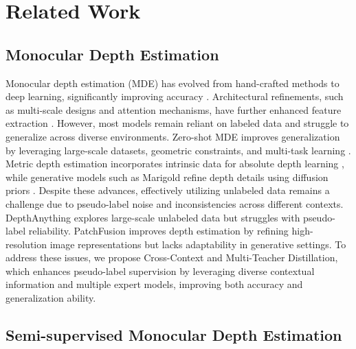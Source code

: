 \section{Related Work}
\label{sec:Related}
\subsection{Monocular Depth Estimation}
Monocular depth estimation (MDE) has evolved from hand-crafted methods to deep learning, significantly improving accuracy \cite{eigen2014depth, laina2016deeper, fu2018deep, godard2017unsupervised, zhou2017unsupervised, ranftl2021vision}. Architectural refinements, such as multi-scale designs and attention mechanisms, have further enhanced feature extraction \cite{hu2018squeeze, chen2017deeplab, zhao2017pyramid}. However, most models remain reliant on labeled data and struggle to generalize across diverse environments.
Zero-shot MDE improves generalization by leveraging large-scale datasets, geometric constraints, and multi-task learning \cite{ranftl2020midas,yin2020diversedepth,yin2020learning,zhang2023robust}. Metric depth estimation incorporates intrinsic data for absolute depth learning \cite{bhat2023zoedepth, yin2023metric3d, hu2024metric3d, wang2024moge}, while generative models such as Marigold refine depth details using diffusion priors \cite{marigold, xu2024diffusion}. 
Despite these advances, effectively utilizing unlabeled data remains a challenge due to pseudo-label noise and inconsistencies across different contexts. DepthAnything \cite{depth_anything_v2} explores large-scale unlabeled data but struggles with pseudo-label reliability. PatchFusion \cite{patchfusion2023, miangoleh2021boosting} improves depth estimation by refining high-resolution image representations but lacks adaptability in generative settings.
To address these issues, we propose Cross-Context and Multi-Teacher Distillation, which enhances pseudo-label supervision by leveraging diverse contextual information and multiple expert models, improving both accuracy and generalization ability.

\subsection{Semi-supervised Monocular Depth Estimation}

